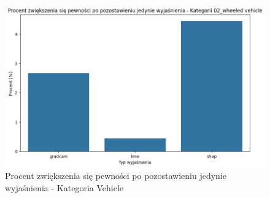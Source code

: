 \begin{figure}
	\begin{minipage}[b]{0.3\textwidth}
		\centering\includegraphics[width=.9\textwidth]{img/base_confidence_womask_percent_vehicle}
		\caption{Procent zwiększenia się pewności po pozostawieniu jedynie wyjaśnienia - Kategoria Vehicle}  \label{rys:base_confidence_womask_percent_vehicle}
	\end{minipage}
\end{figure}
